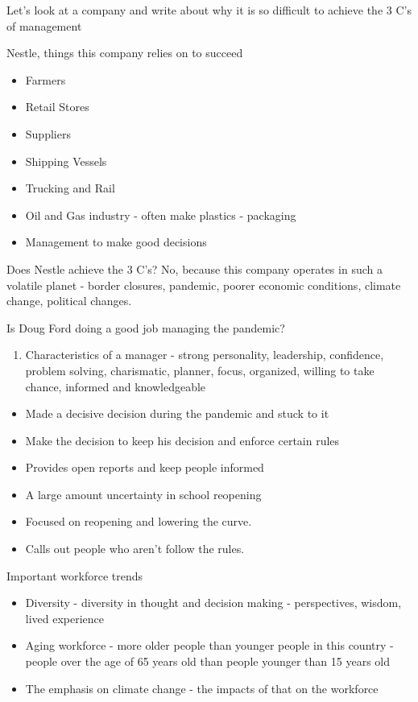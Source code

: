 \documentclass[11pt]{article}
\begin{document}
Let's look at a company and write about why it is so difficult to achieve the 3 C's of management

Nestle, things this company relies on to succeed

\begin{itemize}
    \item Farmers
    \item Retail Stores
    \item Suppliers
    \item Shipping Vessels
    \item Trucking and Rail
    \item Oil and Gas industry - often make plastics - packaging
    \item Management to make good decisions
\end{itemize}


Does Nestle achieve the 3 C's? No, because this company operates in such a volatile planet - border closures, pandemic, poorer economic conditions, climate change, political changes.

Is Doug Ford doing a good job managing the pandemic?

\begin{enumerate}
    \item Characteristics of a manager - strong personality, leadership, confidence, problem solving, charismatic, planner, focus, organized, willing to take chance, informed and knowledgeable
\end{enumerate}

\begin{itemize}
    \item Made a decisive decision during the pandemic and stuck to it
    \item Make the decision to keep his decision and enforce certain rules
    \item Provides open reports and keep people informed
    \item A large amount uncertainty in school reopening
    \item Focused on reopening and lowering the curve.
    \item Calls out people who aren't follow the rules.
\end{itemize}

Important workforce trends

\begin{itemize}
    \item Diversity - diversity in thought and decision making - perspectives, wisdom, lived experience
    \item Aging workforce - more older people than younger people in this country - people over the age of 65 years old than people younger than 15 years old
    \item The emphasis on climate change - the impacts of that on the workforce
\end{itemize}
\end{document}
